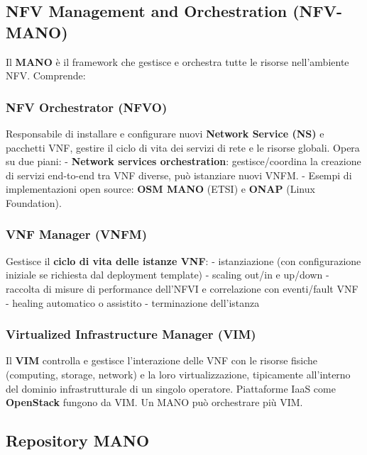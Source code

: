 \documentclass[
  italian,
  openany]{book}
\begin{document}
\subsection{NFV Management and Orchestration
(NFV-MANO)}\label{nfv-management-and-orchestration-nfv-mano}

Il \textbf{MANO} è il framework che gestisce e orchestra tutte le
risorse nell'ambiente NFV. Comprende:

\subsubsection{NFV Orchestrator (NFVO)}\label{nfv-orchestrator-nfvo}

Responsabile di installare e configurare nuovi \textbf{Network Service
(NS)} e pacchetti VNF, gestire il ciclo di vita dei servizi di rete e le
risorse globali. Opera su due piani: - \textbf{Network services
orchestration}: gestisce/coordina la creazione di servizi end-to-end tra
VNF diverse, può istanziare nuovi VNFM. - Esempi di implementazioni open
source: \textbf{OSM MANO} (ETSI) e \textbf{ONAP} (Linux Foundation).

\subsubsection{VNF Manager (VNFM)}\label{vnf-manager-vnfm}

Gestisce il \textbf{ciclo di vita delle istanze VNF}: - istanziazione
(con configurazione iniziale se richiesta dal deployment template) -
scaling out/in e up/down - raccolta di misure di performance dell'NFVI e
correlazione con eventi/fault VNF - healing automatico o assistito -
terminazione dell'istanza

\subsubsection{Virtualized Infrastructure Manager
(VIM)}\label{virtualized-infrastructure-manager-vim}

Il \textbf{VIM} controlla e gestisce l'interazione delle VNF con le
risorse fisiche (computing, storage, network) e la loro
virtualizzazione, tipicamente all'interno del dominio infrastrutturale
di un singolo operatore. Piattaforme IaaS come \textbf{OpenStack}
fungono da VIM. Un MANO può orchestrare più VIM.

\subsection{Repository MANO}\label{repository-mano}
\end{document}
